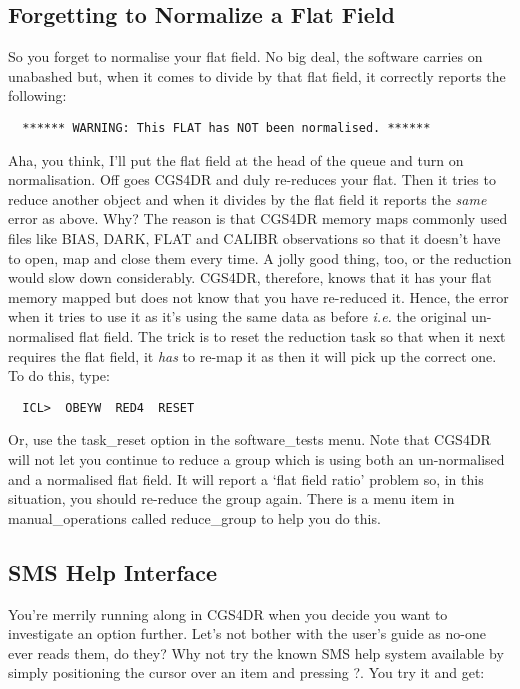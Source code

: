 {\subsection{Forgetting to Normalize a Flat Field}
\label{forgetting_to_normalize_a_flat_field}

So you forget to normalise your flat field. No big deal, the software carries
on unabashed but, when it comes to divide by that flat field, it correctly
reports the following:

\begin{verbatim}
  ****** WARNING: This FLAT has NOT been normalised. ******
\end{verbatim}

Aha, you think, I'll put the flat field at the head of the queue and turn on
normalisation. Off goes CGS4DR and duly re-reduces your flat. Then it tries to
reduce another object and when it divides by the flat field it reports the
{\em same} error as above. Why? The reason is that CGS4DR memory maps 
commonly used files like {\sf BIAS}, {\sf DARK}, {\sf FLAT} and 
{\sf CALIBR} observations so 
that it doesn't have to open, map and close them every time. A jolly good 
thing, too, or the reduction would slow down considerably. CGS4DR, therefore, 
knows that it has your flat memory mapped but does not know that you have
re-reduced it. Hence, the error when it tries to use it as it's 
using the same data as before {\em i.e.} the original un-normalised flat field. 
The trick is to reset the reduction task so that when it next requires the 
flat field, it {\em has} to re-map it as then it will pick up the correct one. 
To do this, type:

\begin{verbatim}
  ICL>  OBEYW  RED4  RESET
\end{verbatim}

Or, use the {\sf task\_reset} option in the {\sf software\_tests} menu. Note that
CGS4DR will not let you continue to reduce a group  which is using both
an un-normalised and a normalised flat field. It will report a `flat field
ratio' problem so, in this situation, you should re-reduce the group again.
There is a menu item in {\sf manual\_operations} called {\sf reduce\_group}
to help you do this.

\subsection{SMS Help Interface}
\label{sms_help_interface}

You're merrily running along in CGS4DR when you decide you want to investigate
an option further. Let's not bother with the user's guide as no-one ever
reads them, do they? Why not try the known SMS help system available by
simply positioning the cursor over an item and pressing {\sf ?}. You try it
and get:

}
